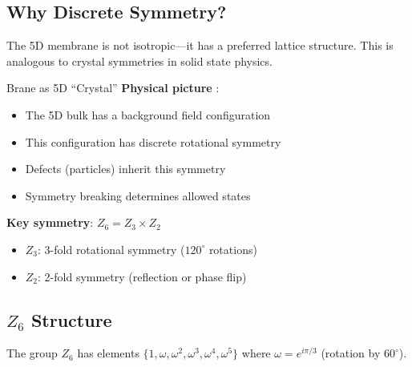 \subsection{Why Discrete Symmetry?}

The 5D membrane is not isotropic---it has a preferred lattice structure.
This is analogous to crystal symmetries in solid state physics.

\begin{mechanism}{Brane as 5D ``Crystal''}
\textbf{Physical picture} \tagP{}:
\begin{itemize}[nosep]
\item The 5D bulk has a background field configuration
\item This configuration has discrete rotational symmetry
\item Defects (particles) inherit this symmetry
\item Symmetry breaking determines allowed states
\end{itemize}

\textbf{Key symmetry}: $Z_6 = Z_3 \times Z_2$
\begin{itemize}[nosep]
\item $Z_3$: 3-fold rotational symmetry ($120^\circ$ rotations)
\item $Z_2$: 2-fold symmetry (reflection or phase flip)
\end{itemize}
\end{mechanism}

\subsection{$Z_6$ Structure}

The group $Z_6$ has elements $\{1, \omega, \omega^2, \omega^3, \omega^4, \omega^5\}$
where $\omega = e^{i\pi/3}$ (rotation by $60^\circ$).

\begin{center}
\end{center}

